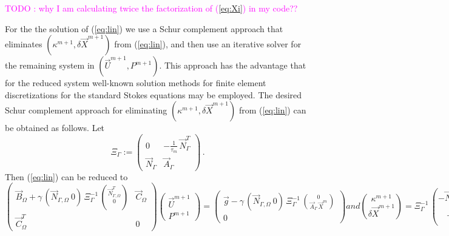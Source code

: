 \documentclass[a4paper,12pt,onecolumn]{article}
\newcommand{\NbulkT}{\vec{N}_{\Gamma,\Omega}^T}
\newcommand{\Nbulk}{\vec{N}_{\Gamma,\Omega}}
\begin{document}
\textcolor{magenta}{TODO : why I am calculating twice the factorization of (\ref{eq:Xi}) in my code??}

For the the solution of (\ref{eq:lin}) we use a Schur complement approach that eliminates $(\kappa^{m+1}, \delta \vec X^{m+1})$ from (\ref{eq:lin}), and then use an iterative solver for the remaining system in $(\vec U^{m+1}, P^{m+1})$. This approach has the advantage that for the reduced system well-known solution methods for finite element discretizations for the standard Stokes equations may be employed. The desired Schur complement approach for eliminating $(\kappa^{m+1},\delta \vec X^{m+1})$ from (\ref{eq:lin}) can be obtained as follows. Let 
\begin{equation} \label{eq:Xi}
\Xi_\Gamma:= \begin{pmatrix}
 0 & - \frac1{\tau_m}\,\vec{N}_\Gamma^T \\
\vec{N}_\Gamma & \vec{A}_\Gamma 
\end{pmatrix} \,.
\end{equation}
Then (\ref{eq:lin}) can be reduced to
\begin{subequations}
\begin{equation} \label{eq:SchurkX}
\begin{pmatrix}
\vec B_\Omega + \gamma\,(\Nbulk \ 0)\,\Xi_\Gamma^{-1}\,
\binom{\NbulkT}{0} & \vec C_\Omega \\
\vec C_\Omega^T & 0 
\end{pmatrix}
\begin{pmatrix}
\vec U^{m+1} \\ P^{m+1} 
\end{pmatrix}
= \begin{pmatrix}
\vec g
-\gamma\,(\Nbulk \ 0)\, \Xi_\Gamma^{-1}\,
\binom{0}{\vec{A}_\Gamma\,\vec{X}^{m}} \\
0
\end{pmatrix}
\end{equation}
and
\begin{equation}
\binom{\kappa^{m+1}}{\delta\vec{X}^{m+1}} = \Xi_\Gamma^{-1}\,
\binom{-\NbulkT\,\vec U^{m+1}}{-\vec{A}_\Gamma\,\vec{X}^{m}}\,.
\label{eq:SchurkXb}
\end{equation}
\end{subequations}
\end{document}
